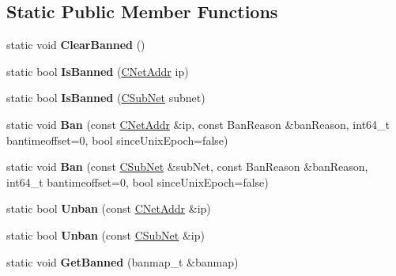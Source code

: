\subsection*{Static Public Member Functions}
\begin{DoxyCompactItemize}
\item 
\mbox{\label{class_c_node_ad75b43ab81213b74446163211c24246a}} 
static void {\bfseries Clear\+Banned} ()
\item 
\mbox{\label{class_c_node_aefa8b81afa53b4c6635dc4c6c024211a}} 
static bool {\bfseries Is\+Banned} (\mbox{\hyperlink{class_c_net_addr}{C\+Net\+Addr}} ip)
\item 
\mbox{\label{class_c_node_ad83383fc3ac2c77ce05fa153c65c8f55}} 
static bool {\bfseries Is\+Banned} (\mbox{\hyperlink{class_c_sub_net}{C\+Sub\+Net}} subnet)
\item 
\mbox{\label{class_c_node_abcf61a98cdd7f8798f9bf3df88df4462}} 
static void {\bfseries Ban} (const \mbox{\hyperlink{class_c_net_addr}{C\+Net\+Addr}} \&ip, const Ban\+Reason \&ban\+Reason, int64\+\_\+t bantimeoffset=0, bool since\+Unix\+Epoch=false)
\item 
\mbox{\label{class_c_node_a9dfa01c3df4313552df8068f6a12c366}} 
static void {\bfseries Ban} (const \mbox{\hyperlink{class_c_sub_net}{C\+Sub\+Net}} \&sub\+Net, const Ban\+Reason \&ban\+Reason, int64\+\_\+t bantimeoffset=0, bool since\+Unix\+Epoch=false)
\item 
\mbox{\label{class_c_node_ad182be70ca3fb1acfd50a0a7f04f2960}} 
static bool {\bfseries Unban} (const \mbox{\hyperlink{class_c_net_addr}{C\+Net\+Addr}} \&ip)
\item 
\mbox{\label{class_c_node_ab14e0dfd252421528a303aaad698e700}} 
static bool {\bfseries Unban} (const \mbox{\hyperlink{class_c_sub_net}{C\+Sub\+Net}} \&ip)
\item 
\mbox{\label{class_c_node_ac7dc25e8d4c24df89befe4dcc2060372}} 
static void {\bfseries Get\+Banned} (banmap\+\_\+t \&banmap)
\item 
\mbox{\label{class_c_node_a02b1fa58052caeb6089ccc0c5c34de70}} 

\end{DoxyCompactItemize}
